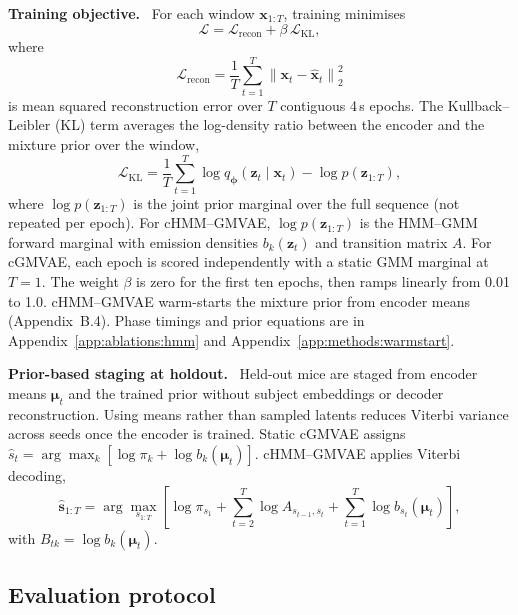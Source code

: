 \documentclass[10pt,letterpaper]{article}
\newcommand{\methodpara}[1]{\par\vspace{0.85em}\noindent\textbf{#1}\ }
\newcommand{\apdx}[1]{Appendix~\ref{#1}}
\newcommand{\papersubsection}[1]{\subsection{#1}}
\newcommand{\papersubsection}[1]{\subsection*{#1}}
\begin{document}
\methodpara{Training objective.}
For each window $\mathbf{x}_{1:T}$, training minimises
\begin{equation}
\label{eq:loss}
\mathcal{L} = \mathcal{L}_{\mathrm{recon}} + \beta\,\mathcal{L}_{\mathrm{KL}},
\end{equation}
where
\begin{equation}
\label{eq:recon}
\mathcal{L}_{\mathrm{recon}} = \frac{1}{T}\sum_{t=1}^{T}\left\|\mathbf{x}_t - \hat{\mathbf{x}}_t\right\|_2^2
\end{equation}
is mean squared reconstruction error over $T$ contiguous 4\,s epochs.
The Kullback--Leibler (KL) term averages the log-density ratio between the encoder and the mixture prior over the window,
\begin{equation}
\label{eq:kl_hmm}
\mathcal{L}_{\mathrm{KL}} = \frac{1}{T}\sum_{t=1}^{T}\log q_{\boldsymbol{\phi}}(\mathbf{z}_t \mid \mathbf{x}_t) - \log p(\mathbf{z}_{1:T}),
\end{equation}
where $\log p(\mathbf{z}_{1:T})$ is the joint prior marginal over the full sequence (not repeated per epoch).
For cHMM--GMVAE, $\log p(\mathbf{z}_{1:T})$ is the HMM--GMM forward marginal with emission densities $b_k(\mathbf{z}_t)$ and transition matrix $A$.
For cGMVAE, each epoch is scored independently with a static GMM marginal at $T{=}1$.
The weight $\beta$ is zero for the first ten epochs, then ramps linearly from 0.01 to 1.0.
cHMM--GMVAE warm-starts the mixture prior from encoder means (Appendix~B.4).
Phase timings and prior equations are in \apdx{app:ablations:hmm} and \apdx{app:methods:warmstart}.

\methodpara{Prior-based staging at holdout.}
Held-out mice are staged from encoder means $\boldsymbol{\mu}_t$ and the trained prior without subject embeddings or decoder reconstruction.
Using means rather than sampled latents reduces Viterbi variance across seeds once the encoder is trained.
Static cGMVAE assigns $\hat{s}_t = \arg\max_k \left[\log \pi_k + \log b_k(\boldsymbol{\mu}_t)\right]$.
cHMM--GMVAE applies Viterbi decoding,
\begin{equation}
\label{eq:viterbi}
\hat{\mathbf{s}}_{1:T} = \arg\max_{s_{1:T}} \left[\log \pi_{s_1} + \sum_{t=2}^{T}\log A_{s_{t-1}, s_t} + \sum_{t=1}^{T}\log b_{s_t}(\boldsymbol{\mu}_t)\right],
\end{equation}
with $B_{tk} = \log b_k(\boldsymbol{\mu}_t)$.

\papersubsection{Evaluation protocol}
\end{document}
